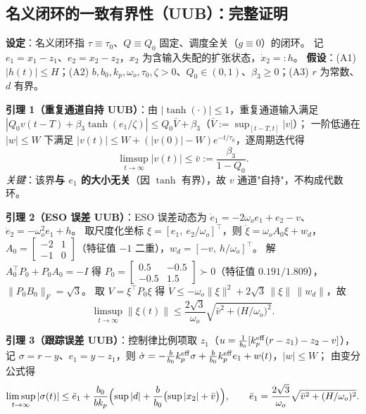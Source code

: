 \subsection{名义闭环的一致有界性（UUB）：完整证明}\label{sec:uub}
\textbf{设定}：名义闭环指 $\tau\equiv\tau_0$、$Q\equiv Q_0$ 固定、调度全关（$g\equiv0$）的闭环。
记 $e_1=x_1-z_1$、$e_2=x_2-z_2$，$x_2$ 为含输入失配的扩张状态，$\dot x_2=:h$。
\textbf{假设}：(A1) $|h(t)|\le H$；(A2) $b,b_0,k_p,\omega_o,\tau_0,\zeta>0$、$Q_0\in(0,1)$、$\beta_3\ge0$；(A3) $r$ 为常数、$d$ 有界。

\noindent\textbf{引理 1（重复通道自持 UUB）}：由 $|\tanh(\cdot)|\le1$，重复通道输入满足
$|Q_0v(t-T)+\beta_3\tanh(e_1/\zeta)|\le Q_0\bar V+\beta_3$（$\bar V:=\sup_{[t-T,t]}|v|$）；
一阶低通在 $|w|\le W$ 下满足 $|v(t)|\le W+(|v(0)|-W)e^{-t/\tau_0}$，逐周期迭代得
\begin{equation}
\limsup_{t\to\infty}|v(t)|\le\bar v:=\frac{\beta_3}{1-Q_0}.
\label{eq:uub-v}
\end{equation}
\emph{关键}：该界\textbf{与 $e_1$ 的大小无关}（因 $\tanh$ 有界），故 $v$ 通道"自持"，不构成代数环。

\noindent\textbf{引理 2（ESO 误差 UUB）}：ESO 误差动态为 $\dot e_1=-2\omega_o e_1+e_2-v$、$\dot e_2=-\omega_o^{2}e_1+h$。
取尺度化坐标 $\xi=[e_1,\ e_2/\omega_o]^{\!\top}$，则 $\dot\xi=\omega_o A_0\xi+w_d$，
$A_0=\left[\begin{smallmatrix}-2&1\\-1&0\end{smallmatrix}\right]$（特征值 $-1$ 二重），$w_d=[-v,\ h/\omega_o]^{\!\top}$。
解 $A_0^{\!\top}P_0+P_0A_0=-I$ 得 $P_0=\left[\begin{smallmatrix}0.5&-0.5\\-0.5&1.5\end{smallmatrix}\right]\succ0$（特征值 $0.191/1.809$），$\|P_0B_0\|_F=\sqrt3$。
取 $V=\xi^{\!\top}P_0\xi$ 得 $\dot V\le-\omega_o\|\xi\|^{2}+2\sqrt3\,\|\xi\|\,\|w_d\|$，故
\begin{equation}
\limsup_{t\to\infty}\|\xi(t)\|\le\frac{2\sqrt3}{\omega_o}\sqrt{\bar v^{2}+\bigl(H/\omega_o\bigr)^{2}} .
\label{eq:uub-eso}
\end{equation}

\noindent\textbf{引理 3（跟踪误差 UUB）}：控制律比例项取 $z_1$（$u=\frac{1}{b_0}[k_p^{\rm eff}(r-z_1)-z_2-v]$），
记 $\sigma=r-y$、$e_1=y-z_1$，则 $\dot\sigma=-\frac{b}{b_0}k_p^{\rm eff}\sigma+\frac{b}{b_0}k_p^{\rm eff}e_1+w(t)$，$|w|\le W$；
由变分公式得
\begin{equation}
\limsup_{t\to\infty}|\sigma(t)|\le\bar e_1+\frac{b_0}{bk_p}\Bigl(\sup|d|+\frac{b}{b_0}\bigl(\sup|x_2|+\bar v\bigr)\Bigr),
\qquad
\bar e_1=\frac{2\sqrt3}{\omega_o}\sqrt{\bar v^2+(H/\omega_o)^2}.
\label{eq:uub-track}
\end{equation}

